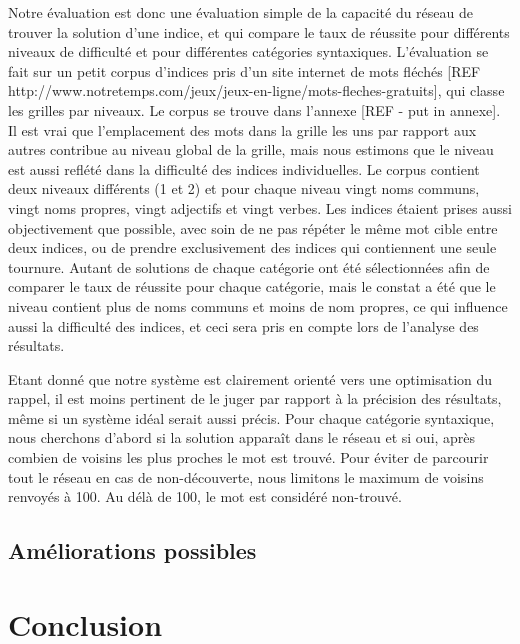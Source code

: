 \documentclass[a4paper, 12pt]{article}
\begin{document}
Notre évaluation est donc une évaluation simple de la capacité du réseau de trouver la solution d'une indice, et qui compare le taux de réussite pour différents niveaux de difficulté et pour différentes catégories syntaxiques. L'évaluation se fait sur un petit corpus d'indices pris d'un site internet de mots fléchés [REF http://www.notretemps.com/jeux/jeux-en-ligne/mots-fleches-gratuits], qui classe les grilles par niveaux. Le corpus se trouve dans l'annexe [REF - put in annexe]. Il est vrai que l'emplacement des mots dans la grille les uns par rapport aux autres contribue au niveau global de la grille, mais nous estimons que le niveau est aussi reflété dans la difficulté des indices individuelles. Le corpus contient deux niveaux différents (1 et 2) et pour chaque niveau vingt noms communs, vingt noms propres, vingt adjectifs et vingt verbes. Les indices étaient prises aussi objectivement que possible, avec soin de ne pas répéter le même mot cible entre deux indices, ou de prendre exclusivement des indices qui contiennent une seule tournure. Autant de solutions de chaque catégorie ont été sélectionnées afin de comparer le taux de réussite pour chaque catégorie, mais le constat a été que le niveau contient plus de noms communs et moins de nom propres, ce qui influence aussi la difficulté des indices, et ceci sera pris en compte lors de l'analyse des résultats.

Etant donné que notre système est clairement orienté vers une optimisation du rappel, il est moins pertinent de le juger par rapport à la précision des résultats, même si un système idéal serait aussi précis. Pour chaque catégorie syntaxique, nous cherchons d'abord si la solution apparaît dans le réseau et si oui, après combien de voisins les plus proches le mot est trouvé. Pour éviter de parcourir tout le réseau en cas de non-découverte, nous limitons le maximum de voisins renvoyés à 100. Au délà de 100, le mot est considéré non-trouvé.





\subsection{Améliorations possibles}

\section{Conclusion}
\end{document}
